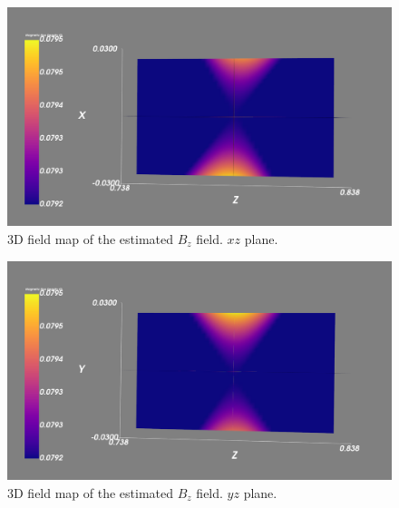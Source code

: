 \begin{figure}[!h]
    \centering
    \includegraphics[width=\linewidth]{figs/3dxview}
    \caption{3D field map of the estimated $B_z$ field.
    $xz$ plane.}
    \label{fig:3dmapxz}
\end{figure}

\begin{figure}[!h]
    \centering
    \includegraphics[width=\linewidth]{figs/3dyview.png}
    \caption{3D field map of the estimated $B_z$ field.
    $yz$ plane.}
    \label{fig:3dmapyz}
\end{figure}
